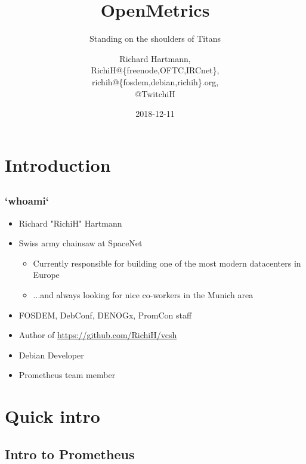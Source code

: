 \documentclass[aspectratio=169]{beamer}
\title{OpenMetrics}
\subtitle{Standing on the shoulders of Titans}
\author{Richard Hartmann,\\
RichiH@\{freenode,OFTC,IRCnet\},\\
richih@\{fosdem,debian,richih\}.org,\\
@TwitchiH}
\date{2018-12-11}
\begin{document}
\setcounter{tocdepth}{1}

\section{Introduction}

\subsection{}

\begin{frame}
	\titlepage
\end{frame}


\subsection{}

\begin{frame}
	\frametitle{`whoami`}
	\begin{itemize}
		\item Richard "RichiH" Hartmann
		\item Swiss army chainsaw at SpaceNet
		\begin{itemize}
			\item Currently responsible for building one of the most modern datacenters in Europe
			\item ...and always looking for nice co-workers in the Munich area
		\end{itemize}
		\item FOSDEM, DebConf, DENOGx, PromCon staff
		\item Author of \url{https://github.com/RichiH/vcsh}
		\item Debian Developer
		\item Prometheus team member
	\end{itemize}
\end{frame}


\section{Quick intro}

\subsection{Intro to Prometheus}
\end{document}
